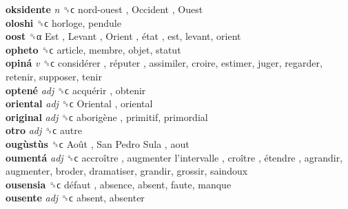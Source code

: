 \textbf{oksidente} \emph{n}  ␝ϲ   nord-ouest ,  Occident ,  Ouest   \\
\textbf{oloshi} ␝ϲ  horloge, pendule  \\
\textbf{oost} ␝α   Est ,  Levant ,  Orient ,  état , est, levant, orient  \\
\textbf{opheto} ␝ϲ  article, membre, objet, statut  \\
\textbf{opiná} \emph{v}  ␝ϲ   considérer ,  réputer , assimiler, croire, estimer, juger, regarder, retenir, supposer, tenir  \\
\textbf{optené} \emph{adj}  ␝ϲ   acquérir , obtenir  \\
\textbf{oriental} \emph{adj}  ␝ϲ   Oriental , oriental  \\
\textbf{original} \emph{adj}  ␝ϲ   aborigène , primitif, primordial  \\
\textbf{otro} \emph{adj}  ␝ϲ  autre  \\
\textbf{ougùstùs} ␝ϲ   Août ,  San Pedro Sula , aout  \\
\textbf{oumentá} \emph{adj}  ␝ϲ   accroître ,  augmenter l’intervalle ,  croître ,  étendre , agrandir, augmenter, broder, dramatiser, grandir, grossir, saindoux  \\
\textbf{ousensia} ␝ϲ   défaut , absence, absent, faute, manque  \\
\textbf{ousente} \emph{adj}  ␝ϲ  absent, absenter  \\
